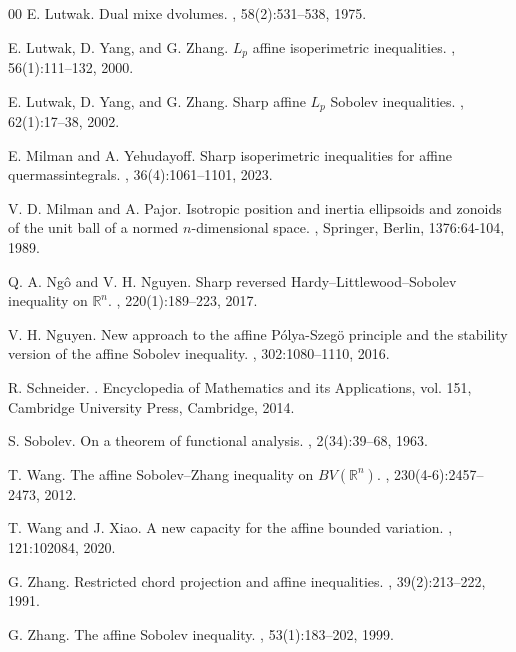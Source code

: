 \documentclass[preprint,12pt]{elsarticle}
\begin{document}
\begin{thebibliography}{00}
E. Lutwak.
\newblock Dual mixe dvolumes.
,
58(2):531--538, 1975.
		
E. Lutwak, D. Yang, and G. Zhang.
\newblock ${L}_{p}$ affine isoperimetric inequalities.
,
56(1):111--132, 2000.
		
E. Lutwak, D. Yang, and G. Zhang.
\newblock Sharp affine ${L}_{p}$ Sobolev inequalities.
,
62(1):17--38, 2002.
		
E. Milman and A. Yehudayoff.
\newblock Sharp isoperimetric inequalities for affine quermassintegrals.
,
36(4):1061--1101, 2023.
		
V. D. Milman and A. Pajor.
\newblock Isotropic position and inertia ellipsoids and zonoids of the unit ball of a normed $n$-dimensional space.
,
Springer, Berlin, 1376:64-104, 1989.
		
Q. A. Ng\^{o} and V. H. Nguyen.
\newblock Sharp reversed Hardy–Littlewood–Sobolev inequality on $\mathbb{R}^n$.
,
220(1):189--223, 2017.

V. H. Nguyen.
\newblock New approach to the affine P\'olya-Szeg\"{o} principle and the stability version of
		the affine Sobolev inequality.
,
302:1080--1110, 2016.
		
R. Schneider.
.
\newblock Encyclopedia of Mathematics and its Applications, vol. 151, Cambridge University Press, Cambridge, 2014.
		
S. Sobolev.
\newblock On a theorem of functional analysis.
,
2(34):39--68, 1963.
		
T. Wang.
\newblock The affine Sobolev–Zhang inequality on $BV(\mathbb{R}^n)$.
,
230(4-6):2457--2473, 2012.
		
T. Wang and J. Xiao.
\newblock A new capacity for the affine bounded variation.
,
121:102084, 2020.
		
G. Zhang.
\newblock Restricted chord projection and affine inequalities.
,
39(2):213--222, 1991.
		
G. Zhang.
\newblock The affine Sobolev inequality.
,
53(1):183--202, 1999.

\end{thebibliography}
\vspace{1.5ex}
\end{document}
